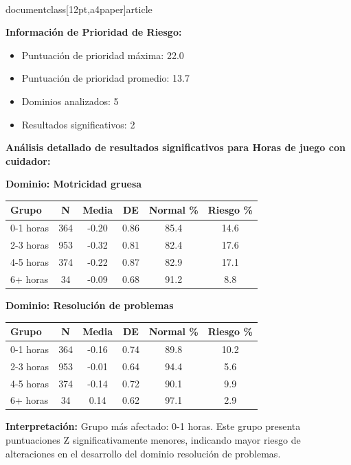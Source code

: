 \\documentclass[12pt,a4paper]{article}
\begin{document}
\textbf{Información de Prioridad de Riesgo:}
\begin{itemize}
\item Puntuación de prioridad máxima: 22.0
\item Puntuación de prioridad promedio: 13.7
\item Dominios analizados: 5
\item Resultados significativos: 2
\end{itemize}


\textbf{Análisis detallado de resultados significativos para Horas de juego con cuidador:}


\textbf{Dominio: Motricidad gruesa}


\begin{center}
\begin{tabular}{|l|c|c|c|c|c|}
\hline
\textbf{Grupo} & \textbf{N} & \textbf{Media} & \textbf{DE} & \textbf{Normal \%} & \textbf{Riesgo \%} \\
\hline
0-1 horas & 364 & -0.20 & 0.86 & 85.4 & 14.6 \\
2-3 horas & 953 & -0.32 & 0.81 & 82.4 & 17.6 \\
4-5 horas & 374 & -0.22 & 0.87 & 82.9 & 17.1 \\
6+ horas & 34 & -0.09 & 0.68 & 91.2 & 8.8 \\

\hline
\end{tabular}
\end{center}


\vspace{0.5cm}


\textbf{Dominio: Resolución de problemas}


\begin{center}
\begin{tabular}{|l|c|c|c|c|c|}
\hline
\textbf{Grupo} & \textbf{N} & \textbf{Media} & \textbf{DE} & \textbf{Normal \%} & \textbf{Riesgo \%} \\
\hline
0-1 horas & 364 & -0.16 & 0.74 & 89.8 & 10.2 \\
2-3 horas & 953 & -0.01 & 0.64 & 94.4 & 5.6 \\
4-5 horas & 374 & -0.14 & 0.72 & 90.1 & 9.9 \\
6+ horas & 34 & 0.14 & 0.62 & 97.1 & 2.9 \\

\hline
\end{tabular}
\end{center}


\textbf{Interpretación:} Grupo más afectado: 0-1 horas. Este grupo presenta puntuaciones Z significativamente menores, indicando mayor riesgo de alteraciones en el desarrollo del dominio resolución de problemas.
\end{document}
